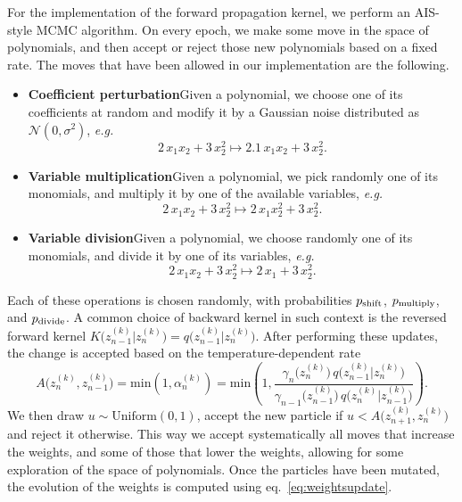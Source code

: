\documentclass[11pt,a4paper]{article}
\begin{document}
	For the implementation of the forward propagation kernel, we perform an AIS-style MCMC algorithm. On every epoch, we make some move in the space of polynomials, and then accept or reject those new polynomials based on a fixed rate. The moves that have been allowed in our implementation are the following.
	\begin{itemize}
		\item \textbf{Coefficient perturbation}\quad Given a polynomial, we choose one of its coefficients at random and modify it by a Gaussian noise distributed as $\mathcal{N}(0,\sigma^2)$, \textit{e.g.}
		\begin{equation}
			2\, x_1x_{2} + 3\, x_2^2 \longmapsto  2.1\, x_1x_{2} + 3\, x_2^2.
		\end{equation}
		\item \textbf{Variable multiplication}\quad Given a polynomial, we pick randomly one of its monomials, and multiply it by one of the available variables, \textit{e.g.}
		\begin{equation}
			2\, x_1x_{2} + 3\, x_2^2 \longmapsto  2\, x_1 x_2^{2} + 3\, x_2^2.
		\end{equation}
		\item \textbf{Variable division}\quad Given a polynomial, we choose randomly one of its monomials, and divide it by one of its variables, \textit{e.g.}
		\begin{equation}
			2\,x_1 x_2 + 3\, x_2^2 \longmapsto  2\, x_1 + 3\, x_2^2.
		\end{equation}
	\end{itemize}
	Each of these operations is chosen randomly, with probabilities $p_{\rm shift}$, $p_{\rm multiply}$, and $p_{\rm divide}$.
	A common choice of backward kernel in such context is the reversed forward kernel $K\big(z^{(k)}_{n-1}\vert z^{(k)}_{n}\big) = q\big(z^{(k)}_{n-1}\vert z^{(k)}_{n}\big)$.
	After performing these updates, the change is accepted based on the temperature-dependent rate
	\begin{equation}\label{eq:acceptanceratio}
		A\big(z_{n}^{(k)},z_{n-1}^{(k)}\big) = \mathrm{min} \left(1,\alpha_{n}^{(k)}\right) = \mathrm{min} \left(1,\frac{\gamma_{n}\big(z_{n}^{(k)}\big)\,q\big(z^{(k)}_{n-1}\vert z^{(k)}_{n}\big)}{\gamma_{n-1}\big(z_{n-1}^{(k)}\big)\,q\big(z^{(k)}_{n}\vert z^{(k)}_{n-1}\big)}  \right).
	\end{equation}
	We then draw $u\sim \mathrm{Uniform}(0,1)$, accept the new particle if $u<A\big(z_{n+1}^{(k)},z_{n}^{(k)}\big)$ and reject it otherwise. This way we accept systematically all moves that increase the weights, and some of those that lower the weights, allowing for some exploration of the space of polynomials.	Once the particles have been mutated, the evolution of the weights is computed using eq.~\eqref{eq:weightsupdate}.
\end{document}
